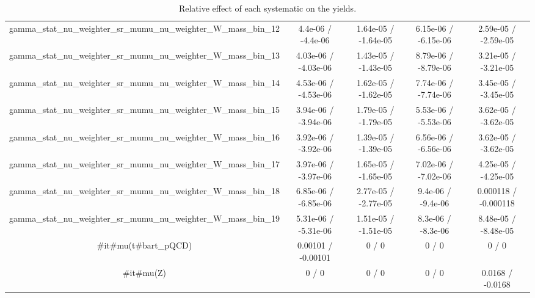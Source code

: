 \documentclass[10pt]{article}
\begin{document}
\begin{table}[htbp]
\begin{center}
\begin{tabular}{|c|c|c|c|c|}
  gamma_stat_nu_weighter_sr_mumu_nu_weighter_W_mass_bin_12 & 4.4e-06 / -4.4e-06 & 1.64e-05 / -1.64e-05 & 6.15e-06 / -6.15e-06 & 2.59e-05 / -2.59e-05 \\ 
  gamma_stat_nu_weighter_sr_mumu_nu_weighter_W_mass_bin_13 & 4.03e-06 / -4.03e-06 & 1.43e-05 / -1.43e-05 & 8.79e-06 / -8.79e-06 & 3.21e-05 / -3.21e-05 \\ 
  gamma_stat_nu_weighter_sr_mumu_nu_weighter_W_mass_bin_14 & 4.53e-06 / -4.53e-06 & 1.62e-05 / -1.62e-05 & 7.74e-06 / -7.74e-06 & 3.45e-05 / -3.45e-05 \\ 
  gamma_stat_nu_weighter_sr_mumu_nu_weighter_W_mass_bin_15 & 3.94e-06 / -3.94e-06 & 1.79e-05 / -1.79e-05 & 5.53e-06 / -5.53e-06 & 3.62e-05 / -3.62e-05 \\ 
  gamma_stat_nu_weighter_sr_mumu_nu_weighter_W_mass_bin_16 & 3.92e-06 / -3.92e-06 & 1.39e-05 / -1.39e-05 & 6.56e-06 / -6.56e-06 & 3.62e-05 / -3.62e-05 \\ 
  gamma_stat_nu_weighter_sr_mumu_nu_weighter_W_mass_bin_17 & 3.97e-06 / -3.97e-06 & 1.65e-05 / -1.65e-05 & 7.02e-06 / -7.02e-06 & 4.25e-05 / -4.25e-05 \\ 
  gamma_stat_nu_weighter_sr_mumu_nu_weighter_W_mass_bin_18 & 6.85e-06 / -6.85e-06 & 2.77e-05 / -2.77e-05 & 9.4e-06 / -9.4e-06 & 0.000118 / -0.000118 \\ 
  gamma_stat_nu_weighter_sr_mumu_nu_weighter_W_mass_bin_19 & 5.31e-06 / -5.31e-06 & 1.51e-05 / -1.51e-05 & 8.3e-06 / -8.3e-06 & 8.48e-05 / -8.48e-05 \\ 
  #it{#mu}(t#bar{t}_{pQCD}) & 0.00101 / -0.00101 & 0 / 0 & 0 / 0 & 0 / 0 \\ 
  #it{#mu}(Z) & 0 / 0 & 0 / 0 & 0 / 0 & 0.0168 / -0.0168 \\ 
\hline 
\end{tabular} 
\caption{Relative effect of each systematic on the yields.} 
\end{center} 
\end{table} 
\end{document}
